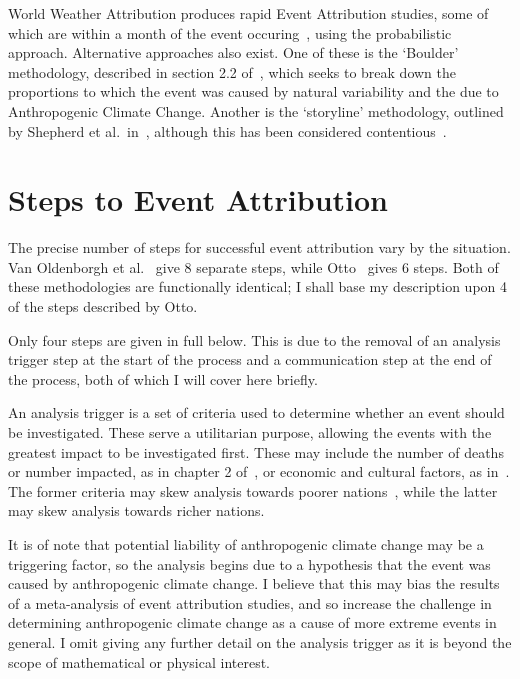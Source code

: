 \documentclass[12pt,a4paper]{report}
\begin{document}
World Weather Attribution produces rapid Event Attribution studies,
    some of which are within a month of the event occuring~\cite{van_Oldenborgh_et_al_2018},
    using the probabilistic approach.
Alternative approaches also exist.
One of these is the `Boulder' methodology,
    described in section 2.2 of~\cite{Otto_2017},
    which seeks to break down the proportions to which the event was caused by natural variability and the due to Anthropogenic Climate Change.
Another is the `storyline' methodology,
    outlined by Shepherd et al.\ in~\cite{Shepherd_et_al_2018},
    although this has been considered contentious~\cite{García-Portela_Maraun_2023}.

\section{Steps to Event Attribution}\label{sec:attrsteps}

The precise number of steps for successful event attribution vary by the situation.
Van Oldenborgh et al.~\cite{van_Oldenborgh_et_al_2021} give 8 separate steps,
    while Otto~\cite{Otto_2017} gives 6 steps.
Both of these methodologies are functionally identical;
    I shall base my description upon 4 of the steps described by Otto.

Only four steps are given in full below.
This is due to the removal of an analysis trigger step at the start of the process
    and a communication step at the end of the process,
    both of which I will cover here briefly.

An analysis trigger is a set of criteria used to determine whether an event should be investigated.
These serve a utilitarian purpose,
    allowing the events with the greatest impact to be investigated first.
These may include the number of deaths or number impacted,
    as in chapter 2 of~\cite{van_Oldenborgh_et_al_2021},
    or economic and cultural factors, as in~\cite{Tett_Soon}.
The former criteria may skew analysis towards poorer nations~\cite{Kahn_2005},
    while the latter may skew analysis towards richer nations.

It is of note that potential liability of anthropogenic climate change may be a triggering factor,
    so the analysis begins due to a hypothesis that the event was caused by anthropogenic climate change.
I believe that this may bias the results of a meta-analysis of event attribution studies,
    and so increase the challenge in determining anthropogenic climate change as a cause of more extreme events in general.
I omit giving any further detail on the analysis trigger as it is beyond the scope of mathematical or physical interest.
\end{document}
